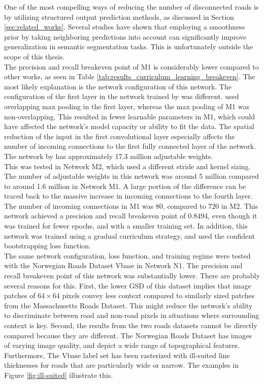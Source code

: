 One of the most compelling ways of reducing the number of disconnected roads is by utilizing structured output prediction methods, as discussed in Section \ref{sec:related_works}. Several studies \citep{Kluckner_semantic_height} \citep{LeCun_semantic} \citep{Mnih_roads_high_res_aerial_images} have shown that employing a smoothness prior by taking neighboring predictions into account can significantly improve generalization in semantic segmentation tasks. This is unfortunately outside the scope of this thesis.\\

The precision and recall breakeven point of M1 is considerably lower compared to other works, as seen in Table \ref{tab:results_curriculum_learning_breakeven}. The most likely explanation is the network configuration of this network. The configuration of the first layer in the network trained by \citep{MnihThesis} was different. \citep{MnihThesis} used overlapping max pooling in the first layer, whereas the max pooling of M1 was non-overlapping. This resulted in fewer learnable parameters in M1, which could have affected the network's model capacity or ability to fit the data. The spatial reduction of the input in the first convolutional layer especially affects the number of incoming connections to the first fully connected layer of the network.  The network by \cite{MnihThesis} has approximately 17.3 million adjustable weights.\\

This was tested in Network M2, which used a different stride and kernel sizing. The number of adjustable weights in this network was around 5 million compared to around 1.6 million in Network M1. A large portion of the difference can be traced back to the massive increase in incoming connections to the fourth layer. The number of incoming connections in M1 was 80, compared to 720 in M2. This network achieved a precision and recall breakeven point of 0.8494, even though it was trained for fewer epochs, and with a smaller training set. In addition, this network was trained using a gradual curriculum strategy, and used the confident bootstrapping loss function. \\

The same network configuration, loss function, and training regime were tested with the Norwegian Roads Dataset Vbase in Network N1. The precision and recall breakeven point of this network was substantially lower. There are probably several reasons for this. First, the lower \ac{GSD} of this dataset implies that image  patches of $64 \times 64$ pixels convey less context compared to similarly sized patches from the Massachusetts Roads Dataset. This might reduce the network's ability to discriminate between road and non-road pixels in situations where surrounding context is key. Second, the results from the two roads datasets cannot be directly compared because they are different. The Norwegian Roads Dataset has images of varying image quality, and depict a wide range of topographical features. Furthermore, The Vbase label set has been rasterized with ill-suited line thicknesses for roads that are particularly wide or narrow. The examples in Figure \ref{fig:ill-suited} illustrate this. 

